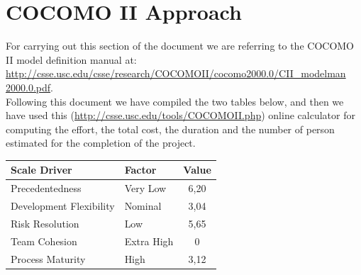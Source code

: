 \chapter{COCOMO II Approach} \label{chap3}
For carrying out this section of the document we are referring to the COCOMO II model definition manual at:\\
\href{http://csse.usc.edu/csse/research/COCOMOII/cocomo2000.0/CII\_modelman2000.0.pdf}{http://csse.usc.edu/csse/research/COCOMOII/cocomo2000.0/CII\_modelman\\2000.0.pdf}.\\
Following this document we have compiled the two tables below, and then we have used this (\href{http://csse.usc.edu/tools/COCOMOII.php}{http://csse.usc.edu/tools/COCOMOII.php}) online calculator for computing the effort, the total cost, the duration and the number of person estimated for the completion of the project.

\begin{table}[!htbp]
\begin{center}
\begin{tabular}[t]{|p{}|p{}|c|}
\hline
\textbf{Scale Driver} & \textbf{Factor} & \textbf{Value} \\
\hline
\hline
Precedentedness & Very Low & 6,20 \\
\hline
Development Flexibility & Nominal & 3,04 \\
\hline
Risk Resolution & Low & 5,65 \\
\hline
Team Cohesion & Extra High & 0 \\
\hline
Process Maturity & High & 3,12 \\
\hline
\end{tabular}
\end{center}
\end{table}
\clearpage

